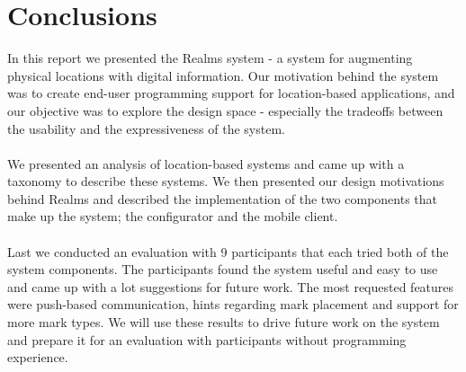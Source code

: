 \section{Conclusions}
\label{sec.conclusions}
In this report we presented the Realms system - a system for augmenting physical locations with digital information. Our motivation behind the system was to create end-user programming support for location-based applications, and our objective was to explore the design space - especially the tradeoffs between the usability and the expressiveness of the system. 
\\\\
We presented an analysis of location-based systems and came up with a taxonomy to describe these systems. We then presented our design motivations behind Realms and described the implementation of the two components that make up the system; the configurator and the mobile client.
\\\\
Last we conducted an evaluation with 9 participants that each tried both of the system components. The participants found the system useful and easy to use and came up with a lot suggestions for future work. The most requested features were push-based communication, hints regarding mark placement and support for more mark types. We will use these results to drive future work on the system and prepare it for an evaluation with participants without programming experience. 